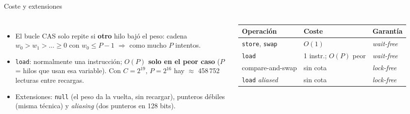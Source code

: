 \documentclass[aspectratio=169,11pt]{beamer}
\begin{document}
\begin{frame}{Coste y extensiones}
  \begin{columns}[T]
    \footnotesize
    \begin{itemize}
      \item El bucle CAS solo repite si \textbf{otro} hilo bajó el peso: cadena $w_0 > w_1 > \dots \ge 0$ con $w_0 \le P-1$ $\Rightarrow$ como mucho $P$ intentos.
      \item \texttt{load}: normalmente una instrucción; \textbf{$O(P)$ solo en el peor caso} ($P$ = hilos que usan esa variable). Con $C = 2^{19}$, $P = 2^{16}$ hay $\approx$ 458\,752 lecturas entre recargas.
      \item Extensiones: \texttt{null} (el peso da la vuelta, sin recargar), punteros débiles (misma técnica) y \emph{aliasing} (dos punteros en 128 bits).
    \end{itemize}
    \renewcommand{\arraystretch}{1.15}\footnotesize
    \begin{tabular}{@{}p{2.1cm}p{1.9cm}l@{}}
      \toprule
      Operación & Coste & Garantía\\
      \midrule
      \texttt{store}, \texttt{swap} & $O(1)$ & \emph{wait-free}\\
      \texttt{load} & 1 instr.; $O(P)$ peor & \emph{wait-free}\\
      compare-and-swap & sin cota & \emph{lock-free}\\
      \texttt{load} \emph{aliased} & sin cota & \emph{lock-free}\\
      \bottomrule
    \end{tabular}
    \par{}
  \end{columns}
\end{frame}
\end{document}
